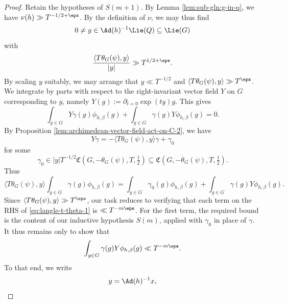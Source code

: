 \begin{proof}
  Retain the hypotheses of $S(m+1)$.  By Lemma \ref{lem:sub-gln:g-in-q}, we have $\nu(h) \gg T^{-1/2+\eps}$.  By the definition of $\nu$, we may thus find
  \begin{equation*}
    0 \neq y \in \Ad(h)^{-1} \Lie(Q) \subseteq \Lie(G)
  \end{equation*}
  with
  \begin{equation*}
    \frac{\langle T \theta_G(\psi), y \rangle}{\lvert y \rvert} \gg T^{1/2 + \eps}.
  \end{equation*}
  By scaling $y$ suitably, we may arrange that $y \ll T^{-1/2}$ and $\langle T \theta_G(\psi), y \rangle \gg T^{\eps}$.  We integrate by parts with respect to the right-invariant vector field $Y$ on $G$ corresponding to $y$, namely $Y(g) := \partial_{t=0} \exp(t y) g$.  This gives
  \begin{equation*}
    \int_{g \in G} Y \gamma(g) \phi_{h, \beta } (g)
    +
    \int_{g \in G} \gamma(g) Y \phi_{h, \beta } (g) = 0.
  \end{equation*}
  By Proposition \ref{lem:archimedean-vector-field-act-on-C-2}, we have
  \begin{equation*}
    Y \gamma = -\langle T \theta_G(\psi), y \rangle \gamma + \gamma_0
  \end{equation*}
  for some
  \begin{equation*}
    \gamma_0 \in
    \lvert y \rvert T^{-1/2}
    \mathfrak{C}(G,-\theta_G(\psi),T,\tfrac{1}{2})
    \subseteq
    \mathfrak{C}(G,-\theta_G(\psi),T,\tfrac{1}{2}).
  \end{equation*}
  Thus
  \begin{equation}\label{eq:langle-t-theta-1}
    \langle T \theta_G(\psi) , y \rangle \int_{g \in G} \gamma(g) \phi_{h,\beta}(g)
    =
    \int_{g \in G} \gamma_0(g) \phi_{h,\beta}(g) + \int_{g \in G} \gamma(g) Y \phi_{h,\beta}(g).
  \end{equation}
  Since $\langle T \theta_G(\psi), y \rangle \gg T^{\eps}$, our task reduces to verifying that each term on the RHS of \eqref{eq:langle-t-theta-1} is $\ll T^{-m \eps}$.  For the first term, the required bound is the content of our inductive hypothesis $S(m)$, applied with $\gamma_0$ in place of $\gamma$.  It thus remains only to show that
  \begin{equation}\label{eq:int-_g-in-1-9}
    \int_{g \in G} \gamma(g) Y \phi_{h,\beta}(g) \ll T^{-m \eps}.
  \end{equation}
  To that end, we write
  \begin{equation*}
    y = \Ad(h)^{-1} x,
  \end{equation*}

\end{proof}
